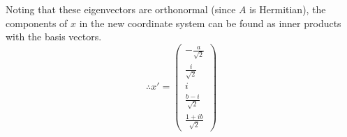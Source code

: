 Noting that these eigenvectors are orthonormal
(since $A$ is Hermitian),
the components of $x$ in the new coordinate system
can be found as inner products with the basis vectors.
\[
    \therefore x' = \begin{pmatrix}
        -\frac{a}{\sqrt{2}}     \\
         \frac{i}{\sqrt{2}}     \\
        i                       \\
        \frac{b - i }{\sqrt{2}} \\
        \frac{1 + ib}{\sqrt{2}}
    \end{pmatrix}
\]
